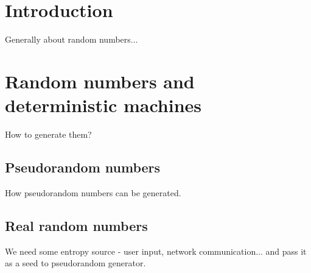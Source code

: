 \chapter{Introduction}
Generally about random numbers... 

\chapter{Random numbers and deterministic machines}
How to generate them?
\section{Pseudorandom numbers}
How pseudorandom numbers can be generated.

\section{Real random numbers}
We need some entropy source - user input, network communication... and pass it as a seed to pseudorandom generator.
